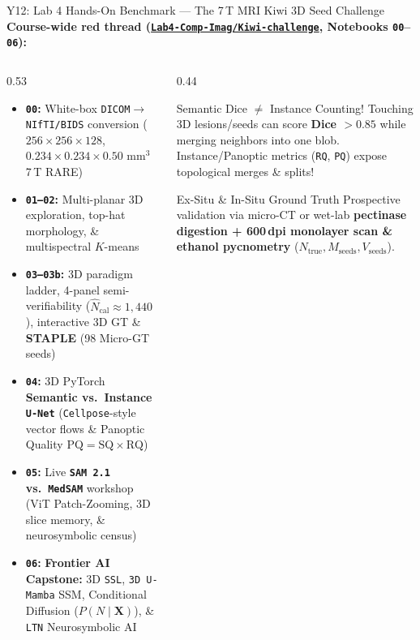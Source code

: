 \documentclass[aspectratio=169, 10pt]{beamer}
\begin{document}
\begin{frame}{Y12: Lab 4 Hands-On Benchmark --- The 7\,T MRI Kiwi 3D Seed Challenge}
    \textbf{Course-wide red thread (\href{https://github.com/arvidl/BMED365-2027/tree/main/Lab4-Comp-Imag/Kiwi-challenge}{\texttt{Lab4-Comp-Imag/Kiwi-challenge}}, Notebooks \texttt{00}--\texttt{06}):}

    \vspace{0.08cm}
    \begin{columns}[T]
        \begin{column}{0.53\textwidth}
            \begin{itemize}\scriptsize
                \item \textbf{\texttt{00}:} White-box \texttt{DICOM$\to$NIfTI/BIDS} conversion ($256\times256\times128$, $0.234\times0.234\times0.50\text{ mm}^3$ 7\,T RARE)
                \item \textbf{\texttt{01--02}:} Multi-planar 3D exploration, top-hat morphology, \& multispectral $K$-means
                \item \textbf{\texttt{03--03b}:} 3D paradigm ladder, 4-panel semi-verifiability ($\hat{N}_{\text{cal}}\approx 1{,}440$), interactive 3D GT \& \textbf{STAPLE} (98 Micro-GT seeds)
                \item \textbf{\texttt{04}:} 3D PyTorch \textbf{Semantic vs.\ Instance \texttt{U-Net}} (\texttt{Cellpose}-style vector flows \& Panoptic Quality $\text{PQ}=\text{SQ}\times\text{RQ}$)
                \item \textbf{\texttt{05}:} Live \textbf{\texttt{SAM\,2.1} vs.\ \texttt{MedSAM}} workshop (ViT Patch-Zooming, 3D slice memory, \& neurosymbolic census)
                \item \textbf{\texttt{06}:} \textbf{Frontier AI Capstone:} 3D \texttt{SSL}, \texttt{3D U-Mamba} SSM, Conditional Diffusion ($P(N\mid\mathbf{X})$), \& \texttt{LTN} Neurosymbolic AI
            \end{itemize}
        \end{column}
        \begin{column}{0.44\textwidth}
            \begin{alertblock}{\footnotesize Semantic Dice $\neq$ Instance Counting!}
                \footnotesize Touching 3D lesions/seeds can score \textbf{Dice $>0.85$} while merging neighbors into one blob. Instance/Panoptic metrics (\texttt{RQ}, \texttt{PQ}) expose topological merges \& splits!
            \end{alertblock}
            \vspace{0.1cm}
            \begin{block}{\footnotesize Ex-Situ \& In-Situ Ground Truth}
                \footnotesize Prospective validation via micro-CT or wet-lab \textbf{pectinase digestion + 600\,dpi monolayer scan \& ethanol pycnometry} ($N_{\text{true}}, M_{\text{seeds}}, V_{\text{seeds}}$).
            \end{block}
        \end{column}
    \end{columns}
\end{frame}
\end{document}
